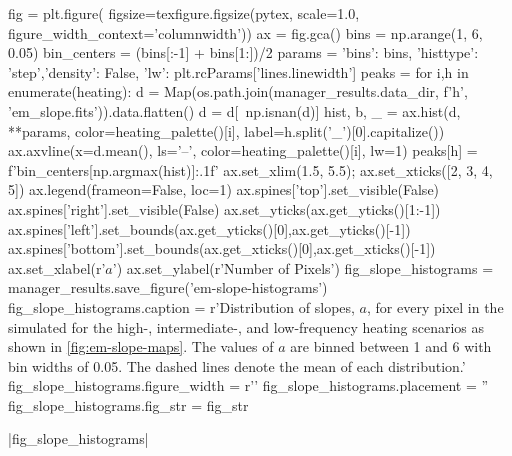 \begin{pycode}
fig = plt.figure(
    figsize=texfigure.figsize(pytex, scale=1.0, figure_width_context='columnwidth'))
ax = fig.gca()
bins = np.arange(1, 6, 0.05)
bin_centers = (bins[:-1] + bins[1:])/2
params = {'bins': bins, 'histtype': 'step','density': False, 
          'lw': plt.rcParams['lines.linewidth']}
peaks = {}
for i,h in enumerate(heating):
    d = Map(os.path.join(manager_results.data_dir, f'{h}', 'em_slope.fits')).data.flatten()
    d = d[~np.isnan(d)]
    hist, b, _ = ax.hist(d, **params, color=heating_palette()[i],
                         label=h.split('_')[0].capitalize())
    ax.axvline(x=d.mean(), ls='--', color=heating_palette()[i], lw=1)
    peaks[h] = f'{bin_centers[np.argmax(hist)]:.1f}'
ax.set_xlim(1.5, 5.5);
ax.set_xticks([2, 3, 4, 5])
ax.legend(frameon=False, loc=1)
ax.spines['top'].set_visible(False)
ax.spines['right'].set_visible(False)
ax.set_yticks(ax.get_yticks()[1:-1])
ax.spines['left'].set_bounds(ax.get_yticks()[0],ax.get_yticks()[-1])
ax.spines['bottom'].set_bounds(ax.get_xticks()[0],ax.get_xticks()[-1])
ax.set_xlabel(r'$a$')
ax.set_ylabel(r'Number of Pixels')
fig_slope_histograms = manager_results.save_figure('em-slope-histograms')
fig_slope_histograms.caption = r'Distribution of \dem{} slopes, $a$, for every pixel in the simulated \AR{} for the high-, intermediate-, and low-frequency heating scenarios as shown in \autoref{fig:em-slope-maps}. The values of $a$ are binned between 1 and 6 with bin widths of 0.05. The dashed lines denote the mean of each distribution.'
fig_slope_histograms.figure_width = r'\columnwidth'
fig_slope_histograms.placement = ''
fig_slope_histograms.fig_str = fig_str
\end{pycode}
|fig_slope_histograms|

